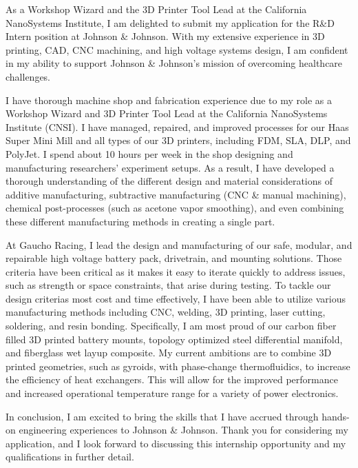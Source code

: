 \documentclass[11pt, letterpaper]{awesome-cv} %
\begin{document}
\makecvheader %

\makelettertitle %


\begin{cvletter}


As a Workshop Wizard and the 3D Printer Tool Lead at the California NanoSystems Institute, I am delighted to submit my application for the R\&D Intern position at Johnson \& Johnson. With my extensive experience in 3D printing, CAD, CNC machining, and high voltage systems design, I am confident in my ability to support Johnson \& Johnson's mission of overcoming healthcare challenges.

I have thorough machine shop and fabrication experience due to my role as a Workshop Wizard and 3D Printer Tool Lead at the California NanoSystems Institute (CNSI). I have managed, repaired, and improved processes for our Haas Super Mini Mill and all types of our 3D printers, including FDM, SLA, DLP, and PolyJet. I spend about 10 hours per week in the shop designing and manufacturing researchers' experiment setups. As a result, I have developed a thorough understanding of the different design and material considerations of additive manufacturing, subtractive manufacturing (CNC \& manual machining), chemical post-processes (such as acetone vapor smoothing), and even combining these different manufacturing methods in creating a single part.

At Gaucho Racing, I lead the design and manufacturing of our safe, modular, and repairable high voltage battery pack, drivetrain, and mounting solutions. Those criteria have been critical as it makes it easy to iterate quickly to address issues, such as strength or space constraints, that arise during testing. To tackle our design criterias most cost and time effectively, I have been able to utilize various manufacturing methods including CNC, welding, 3D printing, laser cutting, soldering, and resin bonding. Specifically, I am most proud of our carbon fiber filled 3D printed battery mounts, topology optimized steel differential manifold, and fiberglass wet layup composite. My current ambitions are to combine 3D printed geometries, such as gyroids, with phase-change thermofluidics, to increase the efficiency of heat exchangers. This will allow for the improved performance and increased operational temperature range for a variety of power electronics.

In conclusion, I am excited to bring the skills that I have accrued through hands-on engineering experiences to Johnson \& Johnson. Thank you for considering my application, and I look forward to discussing this internship opportunity and my qualifications in further detail.


\end{cvletter}


\makeletterclosing %
\end{document}
